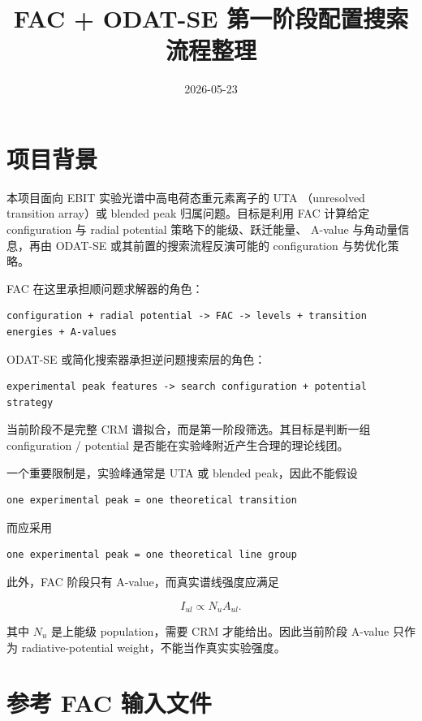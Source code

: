 \documentclass[11pt,a4paper]{article}
\title{FAC + ODAT-SE 第一阶段配置搜索流程整理}
\author{}
\date{2026-05-23}
\begin{document}
\maketitle

\section{项目背景}

本项目面向 EBIT 实验光谱中高电荷态重元素离子的 UTA
（unresolved transition array）或 blended peak 归属问题。目标是利用
FAC 计算给定 configuration 与 radial potential 策略下的能级、跃迁能量、
A-value 与角动量信息，再由 ODAT-SE 或其前置的搜索流程反演可能的
configuration 与势优化策略。

FAC 在这里承担顺问题求解器的角色：

\begin{lstlisting}
configuration + radial potential -> FAC -> levels + transition energies + A-values
\end{lstlisting}

ODAT-SE 或简化搜索器承担逆问题搜索层的角色：

\begin{lstlisting}
experimental peak features -> search configuration + potential strategy
\end{lstlisting}

当前阶段不是完整 CRM 谱拟合，而是第一阶段筛选。其目标是判断一组
configuration / potential 是否能在实验峰附近产生合理的理论线团。

一个重要限制是，实验峰通常是 UTA 或 blended peak，因此不能假设

\begin{lstlisting}
one experimental peak = one theoretical transition
\end{lstlisting}

而应采用

\begin{lstlisting}
one experimental peak = one theoretical line group
\end{lstlisting}

此外，FAC 阶段只有 A-value，而真实谱线强度应满足

\[
I_{ul} \propto N_u A_{ul}.
\]

其中 $N_u$ 是上能级 population，需要 CRM 才能给出。因此当前阶段
A-value 只作为 radiative-potential weight，不能当作真实实验强度。

\section{参考 FAC 输入文件}
\end{document}
